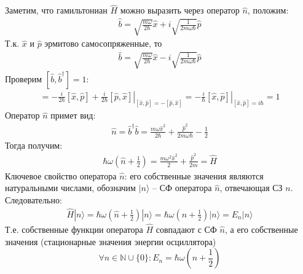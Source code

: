 Заметим, что гамильтониан $\hat{H}$ можно выразить через оператор $\hat{n}$, положим:
\begin{gather*}
\hat{b} = \sqrt{\frac{m\omega}{2\hbar}}\hat{x} + i\sqrt{\frac{1}{2m\omega\hbar}}\hat{p}
\end{gather*}
Т.к. $\hat{x}$ и $\hat{p}$ эрмитово самосопряженные, то
\begin{gather*}
\hat{b} = \sqrt{\frac{m\omega}{2\hbar}}\hat{x} - i\sqrt{\frac{1}{2m\omega\hbar}}\hat{p}
\end{gather*}
Проверим $[\hat{b},\hat{b}^\dagger]=1$:
\begin{gather*}
[\hat{b},\hat{b}^\dagger]
=
\left.
-\frac{i}{2\hbar}[\hat{x},\hat{p}]+\frac{i}{2\hbar}[\hat{p},\hat{x}]
\right|_{[\hat{x},\hat{p}]=-[\hat{p},\hat{x}]}
=
\left.
-\frac{i}{\hbar}[\hat{x},\hat{p}]
\right|_{[\hat{x},\hat{p}]=i\hbar}
=
1
\end{gather*}
Оператор $\hat{n}$ примет вид:
\begin{gather*}
\hat{n}=\hat{b}^\dagger\hat{b}=\frac{m\omega\hat{x}^2}{2\hbar}+\frac{\hat{p}^2}{2m\omega\hbar}-\frac{1}{2}
\end{gather*}
Тогда получим:
\begin{gather*}
\hbar\omega\left(\hat{n}+\frac{1}{2}\right)
=
\frac{m\omega^2\hat{x}^2}{2}+\frac{\hat{p}^2}{2m}
=
\hat{H}
\end{gather*}
Ключевое свойство оператора $\hat{n}$: его собственные значения являются натуральными числами, обозначим $|n\rangle$ -- СФ оператора $\hat{n}$, отвечающая СЗ $n$. Следовательно:
\begin{gather*}
\hat{H}|n\rangle
=
\hbar\omega\left(\hat{n}+\frac{1}{2}\right)|n\rangle
=
\hbar\omega\left(n+\frac{1}{2}\right)|n\rangle
=
E_n|n\rangle
\end{gather*}
Т.е. собственные функции оператора $\hat{H}$ совпадают с СФ $\hat{n}$, а его собственные значения (стационарные значения энергии осциллятора)
$$
\forall n\in\mathbb{N}\cup\{0\}\colon E_n=\hbar\omega\left(n+\frac{1}{2}\right)
$$

